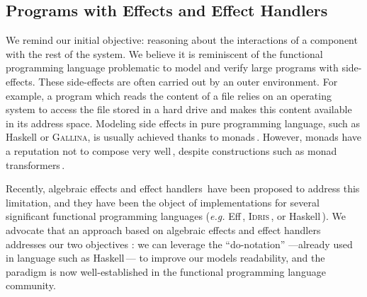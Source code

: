 
\subsection{Programs with Effects and Effect Handlers}
\label{subsec:sota:peff}

We remind our initial objective: reasoning about the interactions of a component
with the rest of the system.
%
We believe it is reminiscent of the functional programming language problematic
to model and verify large programs with side-effects.
%
These side-effects are often carried out by an outer environment.
%
For example, a program which reads the content of a file relies on an operating
system to access the file stored in a hard drive and makes this content
available in its address space.
%
Modeling side effects in pure programming language, such as Haskell or {\scshape
  Gallina}, is usually achieved thanks to
monads\,\cite{wadler1990comprehending,jones2005io}.  However, monads have a reputation not to compose very
well\,\cite{hyland2006combining}, despite constructions such as monad
transformers\,\cite{liang1995mtl}.

Recently, algebraic effects and effect handlers\,\cite{bauer2015effects}
 have been proposed to address this
limitation, and they have been the object of implementations for several
significant functional programming languages (\emph{e.g.}
Eff\,\cite{bauer2015effects}, {\scshape Idris}\,\cite{brady2013idris}, or
Haskell\,\cite{kiselyov2013extensible}).
%
We advocate that an approach based on algebraic effects and effect handlers
addresses our two objectives : we can
leverage the ``do-notation'' ---already used in language such as
Haskell\,\cite{haskell13}--- to improve our models readability, and the paradigm
is now well-established in the functional programming language community.

